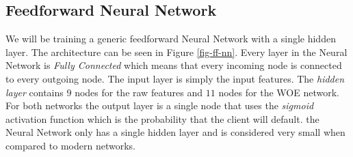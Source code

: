  \begin{table}[h!]
 \footnotesize
\begin{center}
\par\end{center}
\caption{The results of fitting a logistic regression model on the cervical cancer dataset. Shown are the features used in the model, their estimated weights and corresponding odds ratios, and the standard errors of the estimated weights. \cite{molnar2019}}\label{table:logistic}
\end{table}

\subsection{Feedforward Neural Network}
We will be training a generic feedforward Neural Network with a single hidden layer. The architecture can be seen in Figure \ref{fig-ff-nn}. Every layer in the Neural Network is \emph{Fully Connected} which means that every incoming node is connected to every outgoing node. The input layer is simply the input features. The \emph{hidden layer} contains $9$ nodes for the raw features and $11$ nodes for the WOE network. For both networks the output layer is a single node that uses the \emph{sigmoid} activation function which is the probability that the client will default. the Neural Network only has a single hidden layer and is considered very small when compared to modern networks.

